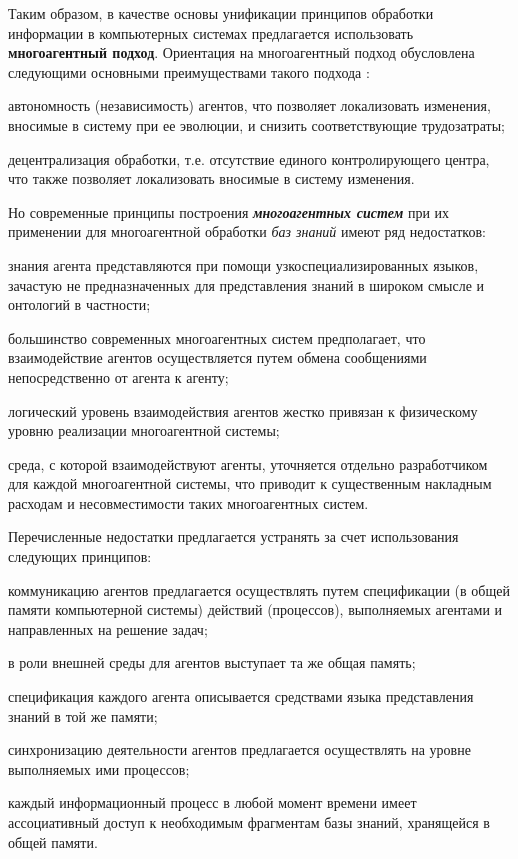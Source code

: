 \begin{SCn}
{Таким образом, в качестве основы унификации принципов обработки информации в компьютерных системах предлагается использовать \textbf{многоагентный подход}. Ориентация на многоагентный подход обусловлена следующими основными преимуществами такого подхода \cite{Wooldridge2009}:

\begin{scnitemize}
    \item автономность (независимость) агентов, что позволяет локализовать изменения, вносимые в систему при ее эволюции, и снизить соответствующие трудозатраты;
    \item децентрализация обработки, т.е. отсутствие единого контролирующего центра, что также позволяет локализовать вносимые в систему изменения.
\end{scnitemize}

Но современные принципы построения \textit{\textbf{многоагентных систем}} при их применении для многоагентной обработки \textit{баз знаний} имеют ряд недостатков:
\begin{scnitemize}
    \item знания агента представляются при помощи узкоспециализированных языков, зачастую не предназначенных для представления знаний в широком смысле и онтологий в частности;
    \item большинство современных многоагентных систем предполагает, что взаимодействие агентов осуществляется путем обмена сообщениями непосредственно от агента к агенту;
    \item логический уровень взаимодействия агентов жестко привязан к физическому уровню реализации многоагентной системы;
    \item среда, с которой взаимодействуют агенты, уточняется отдельно разработчиком для каждой многоагентной системы, что приводит к существенным накладным расходам и несовместимости таких многоагентных систем.
\end{scnitemize}

Перечисленные недостатки предлагается устранять за счет использования следующих принципов:
\begin{scnitemize}
    \item коммуникацию агентов предлагается осуществлять путем спецификации (в общей памяти компьютерной системы) действий (процессов), выполняемых агентами и направленных на решение задач;
    \item в роли внешней среды для агентов выступает та же общая память;
    \item спецификация каждого агента описывается средствами языка представления знаний в той же памяти;
    \item синхронизацию деятельности агентов предлагается осуществлять на уровне выполняемых ими процессов;
    \item каждый информационный процесс в любой момент времени имеет ассоциативный доступ к необходимым фрагментам базы знаний, хранящейся в общей памяти.
\end{scnitemize}
}

\scnendstruct \scnendcurrentsectioncomment

\end{SCn}
